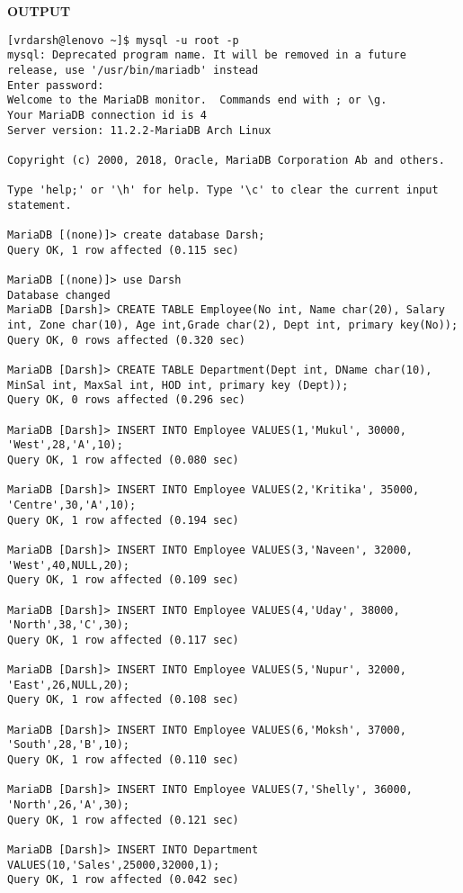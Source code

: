 \documentclass[
a4paper]{article}
\begin{document}
    \begin{center}
			\Large\bfseries OUTPUT
		\end{center}
    \begin{lstlisting}
[vrdarsh@lenovo ~]$ mysql -u root -p
mysql: Deprecated program name. It will be removed in a future release, use '/usr/bin/mariadb' instead
Enter password: 
Welcome to the MariaDB monitor.  Commands end with ; or \g.
Your MariaDB connection id is 4
Server version: 11.2.2-MariaDB Arch Linux

Copyright (c) 2000, 2018, Oracle, MariaDB Corporation Ab and others.

Type 'help;' or '\h' for help. Type '\c' to clear the current input statement.

MariaDB [(none)]> create database Darsh;
Query OK, 1 row affected (0.115 sec)

MariaDB [(none)]> use Darsh
Database changed
MariaDB [Darsh]> CREATE TABLE Employee(No int, Name char(20), Salary int, Zone char(10), Age int,Grade char(2), Dept int, primary key(No));
Query OK, 0 rows affected (0.320 sec)

MariaDB [Darsh]> CREATE TABLE Department(Dept int, DName char(10), MinSal int, MaxSal int, HOD int, primary key (Dept));
Query OK, 0 rows affected (0.296 sec)

MariaDB [Darsh]> INSERT INTO Employee VALUES(1,'Mukul', 30000, 'West',28,'A',10);
Query OK, 1 row affected (0.080 sec)

MariaDB [Darsh]> INSERT INTO Employee VALUES(2,'Kritika', 35000, 'Centre',30,'A',10);
Query OK, 1 row affected (0.194 sec)

MariaDB [Darsh]> INSERT INTO Employee VALUES(3,'Naveen', 32000, 'West',40,NULL,20);
Query OK, 1 row affected (0.109 sec)

MariaDB [Darsh]> INSERT INTO Employee VALUES(4,'Uday', 38000, 'North',38,'C',30);
Query OK, 1 row affected (0.117 sec)

MariaDB [Darsh]> INSERT INTO Employee VALUES(5,'Nupur', 32000, 'East',26,NULL,20);
Query OK, 1 row affected (0.108 sec)

MariaDB [Darsh]> INSERT INTO Employee VALUES(6,'Moksh', 37000, 'South',28,'B',10);
Query OK, 1 row affected (0.110 sec)

MariaDB [Darsh]> INSERT INTO Employee VALUES(7,'Shelly', 36000, 'North',26,'A',30);
Query OK, 1 row affected (0.121 sec)

MariaDB [Darsh]> INSERT INTO Department VALUES(10,'Sales',25000,32000,1);
Query OK, 1 row affected (0.042 sec)


\end{lstlisting}
\end{document}
